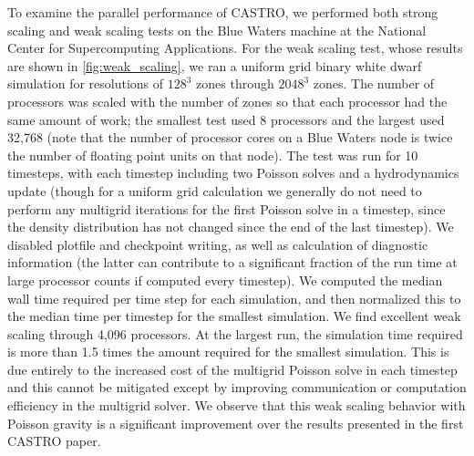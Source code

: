 \documentclass[iop]{../emulateapj}
\begin{document}
To examine the parallel performance of CASTRO, we performed both strong scaling 
and weak scaling tests on the Blue Waters machine at the National Center for 
Supercomputing Applications. For the weak scaling test, whose results are 
shown in \autoref{fig:weak_scaling}, we ran a uniform grid binary white 
dwarf simulation for resolutions of $128^3$ zones through $2048^3$ zones. The 
number of processors was scaled with the number of zones so that each processor 
had the same amount of work; the smallest test used 8 processors and the largest 
used 32,768 (note that the number of processor cores on a Blue Waters node is twice 
the number of floating point units on that node). The test was run for 10 timesteps,
with each timestep including two Poisson solves and a hydrodynamics update (though 
for a uniform grid calculation we generally do not need to perform any multigrid 
iterations for the first Poisson solve in a timestep, since the density distribution 
has not changed since the end of the last timestep). We disabled plotfile and 
checkpoint writing, as well as calculation of diagnostic information (the latter 
can contribute to a significant fraction of the run time at large processor 
counts if computed every timestep). We computed the median wall time required per 
time step for each simulation, and then normalized this to the median time per 
timestep for the smallest simulation. We find excellent weak scaling through 
4,096 processors. At the largest run, the simulation time required is 
more than 1.5 times the amount required for the smallest simulation. 
This is due entirely to the increased cost of the multigrid Poisson solve 
in each timestep and this cannot be mitigated except by improving 
communication or computation efficiency in the multigrid solver. We observe 
that this weak scaling behavior with Poisson gravity is a significant 
improvement over the results presented in the first CASTRO paper.
\end{document}
